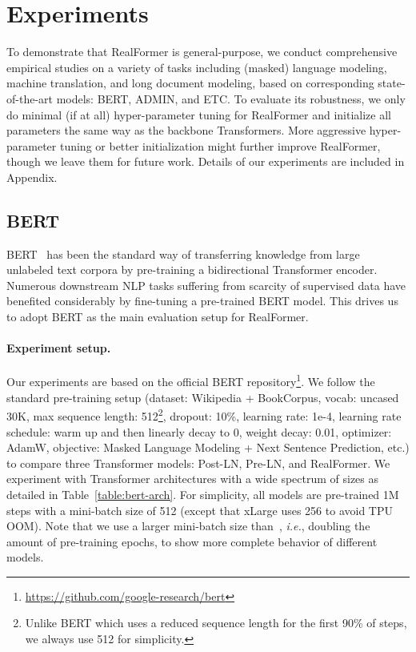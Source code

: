 \documentclass[11pt,a4paper]{article}
\begin{document}
\section{Experiments} \label{sect:exp}
To demonstrate that RealFormer is general-purpose, we conduct comprehensive empirical studies on a variety of tasks including (masked) language modeling, machine translation, and long document modeling, based on corresponding state-of-the-art models: BERT, ADMIN, and ETC.
To evaluate its robustness, we only do minimal (if at all) hyper-parameter tuning for RealFormer and initialize all parameters the same way as the backbone Transformers.
More aggressive hyper-parameter tuning or better initialization might further improve RealFormer, though we leave them for future work.
Details of our experiments are included in Appendix.

\subsection{BERT} \label{sec:bert}
BERT~\citep{Devlin-2019-bert} has been the standard way of transferring knowledge from large unlabeled text corpora by pre-training a bidirectional Transformer encoder. Numerous downstream NLP tasks suffering from scarcity of supervised data have benefited considerably by fine-tuning a pre-trained BERT model. This drives us to adopt BERT as the main evaluation setup for RealFormer.


\paragraph{Experiment setup.}
Our experiments are based on the official BERT repository\footnote{\url{https://github.com/google-research/bert}}. We follow the standard pre-training setup (dataset: Wikipedia + BookCorpus, vocab: uncased 30K, max sequence length: 512\footnote{Unlike BERT which uses a reduced sequence length for the first 90\% of steps, we always use 512 for simplicity.}, dropout: 10\%, learning rate: 1e-4, learning rate schedule: warm up and then linearly decay to 0, weight decay: 0.01, optimizer: AdamW, objective: Masked Language Modeling + Next Sentence Prediction, etc.) to compare three Transformer models: Post-LN, Pre-LN, and RealFormer. 
We experiment with Transformer architectures with a wide spectrum of sizes as detailed in Table~\ref{table:bert-arch}. For simplicity, all models are pre-trained 1M steps with a mini-batch size of 512 (except that xLarge uses 256 to avoid TPU OOM). Note that we use a larger mini-batch size than~\citet{Devlin-2019-bert}, \emph{i.e.}, doubling the amount of pre-training epochs, to show more complete behavior of different models.
\end{document}
